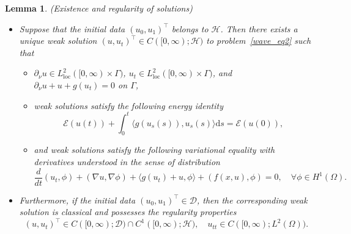 \documentclass{elsarticle}
\newtheorem{lemma}{Lemma}[section]
\begin{document}
\begin{lemma}\label{wellposedness}
{\rm(Existence and regularity of solutions)}
\begin{itemize}
\item Suppose that the initial data $(u_0, u_1)^{\top}$ belongs to $\mathcal{H}$. Then there exists a unique weak solution $(u, u_t)^\top \in C([0, \infty); \mathcal{H})$ to problem~\eqref{wave_eq2} such that
\begin{itemize}
\item $\partial_{\nu}u \in L^{2}_{\mathrm{loc}}([0, \infty)\times\Gamma)$, $u_t \in L^{2}_{\mathrm{loc}}([0, \infty)\times\Gamma)$, and $\partial_{\nu}u + u + g(u_t) = 0$ on $\Gamma$,
\item weak solutions satisfy the following energy identity
	\[
		\mathcal{E}(u(t))  + \int_{0}^{t}\langle  g(u_s(s)), u_s(s)\rangle \mathrm{d}s = \mathcal{E}(u(0)),
	\]
\item and weak solutions satisfy the following variational equality with derivatives understood in the sense of distribution
\[
	\frac{d}{dt}(u_t, \phi) + (\nabla u, \nabla\phi) + \langle  g(u_t) + u, \phi\rangle + (f(x, u), \phi) = 0, \quad \forall \phi\in H^{1}(\Omega).
\]	
\end{itemize}
\item Furthermore, if the initial data $(u_0, u_1)^{\top}\in\mathcal{D}$, then the corresponding weak solution is classical and possesses the regularity properties
\[
	(u, u_t)^\top \in C([0, \infty); \mathcal{D})\cap C^1([0, \infty); \mathcal{H}), \quad u_{tt}\in C([0, \infty); L^2({\Omega})).
\] 
\end{itemize}
\end{lemma}
\end{document}
